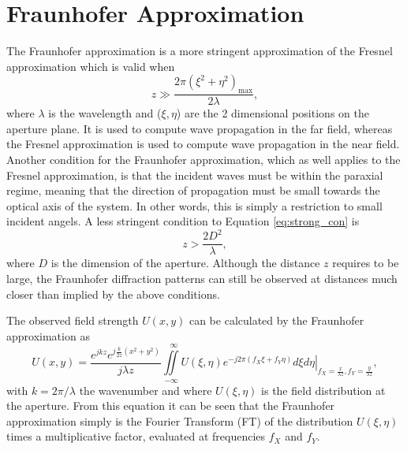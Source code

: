 \section{Fraunhofer Approximation}
\label{sec:FrApprox}
The Fraunhofer approximation is a more stringent approximation of the Fresnel approximation which is valid when
\begin{equation}
z\gg\frac{2\pi(\xi^2+\eta^2)_{\text{max}}}{2\lambda},
\label{eq:strong_con}
\end{equation}
where $\lambda$ is the wavelength and ($\xi,\eta$) are the 2 dimensional positions on the aperture plane. It is used to compute wave propagation in the far field, whereas the Fresnel approximation is used to compute wave propagation in the near field. Another condition for the Fraunhofer approximation, which as well applies to the Fresnel approximation, is that the incident waves must be within the paraxial regime, meaning that the direction of propagation must be small towards the optical axis of the system. In other words, this is simply a restriction to small incident angels. A less stringent condition to Equation \eqref{eq:strong_con} is 
\begin{equation}
z>\frac{2D^2}{\lambda},
\label{eq:normal_con}
\end{equation}
where $D$ is the dimension of the aperture. Although the distance $z$ requires to be large, the Fraunhofer diffraction patterns can still be observed at distances much closer than implied by the above conditions. 

The observed field strength $U(x,y)$ can be calculated by the Fraunhofer approximation as
\begin{equation}
U(x,y)=\frac{e^{jkz}e^{j\frac{k}{2z}(x^2+y^2)}}{j\lambda z}\iint\limits_{-\infty}^{~~~\infty} \left. U(\xi,\eta)e^{-j2\pi(f_X\xi+f_Y\eta)}d\xi d\eta \right|_{f_X=\frac{x}{\lambda z},f_Y=\frac{y}{\lambda z}},
\label{eq:fraunhofer}
\end{equation}
with $k=2\pi/\lambda$ the wavenumber and where $U(\xi,\eta)$ is the field distribution at the aperture. From this equation it can be seen that the Fraunhofer approximation simply is the Fourier Transform (FT) of the distribution $U(\xi,\eta)$ times a multiplicative factor, evaluated at frequencies $f_X$ and $f_Y$.

